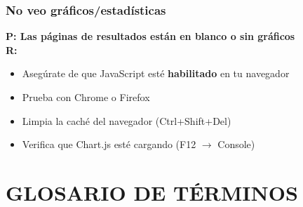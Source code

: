 \documentclass[12pt, a4paper]{report}
\begin{document}
\subsection{No veo gráficos/estadísticas}
\textbf{P: Las páginas de resultados están en blanco o sin gráficos}\\
\textbf{R:}
\begin{itemize}
    \item Asegúrate de que JavaScript esté \textbf{habilitado} en tu navegador
    \item Prueba con Chrome o Firefox
    \item Limpia la caché del navegador (Ctrl+Shift+Del)
    \item Verifica que Chart.js esté cargando (F12 $\rightarrow$ Console)
\end{itemize}

\chapter{GLOSARIO DE TÉRMINOS}
\end{document}
